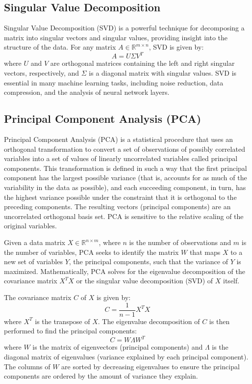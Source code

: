 \subsection{Singular Value Decomposition}
Singular Value Decomposition (SVD) is a powerful technique for decomposing a matrix into singular vectors and singular values, providing insight into the structure of the data. For any matrix $A \in \mathbb{R}^{m \times n}$, SVD is given by:
\begin{equation}
    A = U\Sigma V^T
    \label{eq:svd}
\end{equation}
where $U$ and $V$ are orthogonal matrices containing the left and right singular vectors, respectively, and $\Sigma$ is a diagonal matrix with singular values. SVD is essential in many machine learning tasks, including noise reduction, data compression, and the analysis of neural network layers.

\subsection{Principal Component Analysis (PCA)}
Principal Component Analysis (PCA) is a statistical procedure that uses an orthogonal transformation to convert a set of observations of possibly correlated variables into a set of values of linearly uncorrelated variables called principal components. This transformation is defined in such a way that the first principal component has the largest possible variance (that is, accounts for as much of the variability in the data as possible), and each succeeding component, in turn, has the highest variance possible under the constraint that it is orthogonal to the preceding components. The resulting vectors (principal components) are an uncorrelated orthogonal basis set. PCA is sensitive to the relative scaling of the original variables.

Given a data matrix $X \in \mathbb{R}^{n \times m}$, where $n$ is the number of observations and $m$ is the number of variables, PCA seeks to identify the matrix $W$ that maps $X$ to a new set of variables $Y$, the principal components, such that the variance of $Y$ is maximized. Mathematically, PCA solves for the eigenvalue decomposition of the covariance matrix $X^TX$ or the singular value decomposition (SVD) of $X$ itself.

The covariance matrix $C$ of $X$ is given by:
\begin{equation}
    C = \frac{1}{n-1}X^TX
    \label{eq:covariance_matrix}
\end{equation}
where $X^T$ is the transpose of $X$. The eigenvalue decomposition of $C$ is then performed to find the principal components:
\begin{equation}
    C = W\Lambda W^T
    \label{eq:eigen_decomposition}
\end{equation}
where $W$ is the matrix of eigenvectors (principal components) and $\Lambda$ is the diagonal matrix of eigenvalues (variance explained by each principal component). The columns of $W$ are sorted by decreasing eigenvalues to ensure the principal components are ordered by the amount of variance they explain.

